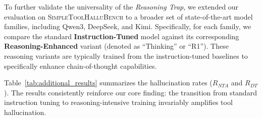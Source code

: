 \documentclass[11pt]{article}
\begin{document}
To further validate the universality of the \textit{Reasoning Trap}, we extended our evaluation on \textsc{SimpleToolHalluBench} to a broader set of state-of-the-art model families, including Qwen3, DeepSeek, and Kimi. Specifically, for each family, we compare the standard \textbf{Instruction-Tuned} model against its corresponding \textbf{Reasoning-Enhanced} variant (denoted as ``Thinking'' or ``R1''). These reasoning variants are typically trained from the instruction-tuned baselines to specifically enhance chain-of-thought capabilities.

\begin{table}[h]
    \centering
    \caption{Hallucination rates on \textsc{SimpleToolHalluBench} across additional model families. Consistent with our findings, the reasoning-enhanced configurations (Thinking/R1) exhibit consistently higher hallucination rates compared to their instruction-tuned baselines.}
    \label{tab:additional_results}
\end{table}

Table~\ref{tab:additional_results} summarizes the hallucination rates ($R_{NTA}$ and $R_{DT}$). The results consistently reinforce our core finding: the transition from standard instruction tuning to reasoning-intensive training invariably amplifies tool hallucination.
\end{document}
